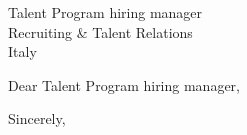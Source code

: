 \documentclass[10pt,letter]{letter}
\def\hm{ Talent Program hiring manager} %
\begin{document}
    \begin{letter}{\hm \\ Recruiting & Talent Relations \\ Italy}
\opening{Dear \hm,}

\setlength\parindent{.5in}



 

\closing{Sincerely,}
\end{letter}
\end{document}
